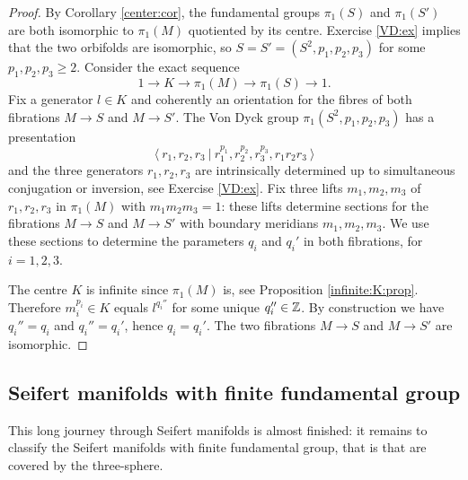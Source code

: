 \begin{proof}
By Corollary \ref{center:cor}, the fundamental groups $\pi_1(S)$ and $\pi_1(S')$ are both isomorphic to $\pi_1(M)$ quotiented by its centre. Exercise \ref{VD:ex} implies that the two orbifolds are isomorphic, so $S=S' = (S^2, p_1,p_2,p_3)$ for some $p_1, p_2, p_3 \geqslant 2$. 
Consider the exact sequence
$$1 \longrightarrow K \longrightarrow \pi_1(M) \longrightarrow \pi_1(S)\longrightarrow 1.$$
Fix a generator $l\in K$ and coherently an orientation for the fibres of both fibrations $M\to S$ and $M\to S'$. 
The Von Dyck group $\pi_1(S^2,p_1,p_2,p_3)$ has a presentation 
$$\langle\ r_1, r_2, r_3\ |\ r_1^{p_1}, r_2^{p_2}, r_3^{p_3}, r_1r_2r_3\ \rangle$$
and the three generators $r_1, r_2, r_3$ are intrinsically determined up to simultaneous conjugation or inversion, see Exercise \ref{VD:ex}. Fix three lifts $m_1, m_2, m_3$ of $r_1, r_2, r_3$ in $\pi_1(M)$ with $m_1m_2m_3 = 1$: these lifts determine sections for the fibrations $M\to S$ and $M\to S'$ with boundary meridians $m_1,m_2,m_3$. We use these sections to determine the parameters $q_i$ and $q_i'$ in both fibrations, for $i=1,2,3$.

The centre $K$ is infinite since $\pi_1(M)$ is, see Proposition \ref{infinite:K:prop}. Therefore $m_i^{p_i} \in K$ equals $l^{q_i''}$ for some unique $q_i''\in \mathbb{Z}$. By construction we have $q_i'' = q_i$ and $q_i'' = q_i'$, hence $q_i=q_i'$. The two fibrations $M\to S$ and $M\to S'$ are isomorphic.
\end{proof}

\subsection{Seifert manifolds with finite fundamental group} \label{Seifert:finite:subsection}
This long journey through Seifert manifolds is almost finished: it remains to classify the Seifert manifolds with finite fundamental group, that is that are covered by the three-sphere.


